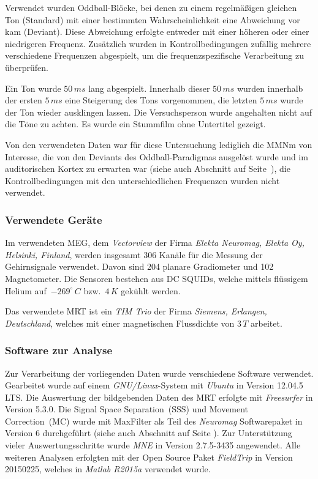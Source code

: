 \documentclass[doc,a4paper,12pt]{apa6}
\makeatletter
\DeclareRobustCommand*{\nameref}[1]{%
      \glqq{\myorg@nameref{#1}}\grqq%
    }%
\makeatother
\begin{document}
Verwendet wurden Oddball-Blöcke, bei denen zu einem regelmäßigen gleichen Ton (Standard) mit einer bestimmten Wahrscheinlichkeit eine Abweichung vor kam (Deviant). Diese Abweichung erfolgte entweder mit einer höheren oder einer niedrigeren Frequenz. Zusätzlich wurden in Kontrollbedingungen zufällig mehrere verschiedene Frequenzen abgespielt, um die frequenzspezifische Verarbeitung zu überprüfen.

Ein Ton wurde $50\,ms$ lang abgespielt. Innerhalb dieser $50\,ms$ wurden innerhalb der ersten $5\,ms$ eine Steigerung des Tons vorgenommen, die letzten $5\,ms$ wurde der Ton wieder ausklingen lassen. Die Versuchsperson wurde angehalten nicht auf die Töne zu achten. Es wurde ein Stummfilm ohne Untertitel gezeigt.

Von den verwendeten Daten war für diese Untersuchung lediglich die MMNm von Interesse, die von den Deviants des Oddball-Paradigmas ausgelöst wurde und im auditorischen Kortex zu erwarten war (siehe auch Abschnitt \nameref{sec:audicort} auf Seite~\pageref{sec:audicort}), die Kontrollbedingungen mit den unterschiedlichen Frequenzen wurden nicht verwendet.

\subsubsection{Verwendete Geräte}

Im verwendeten MEG, dem \emph{Vectorview} der Firma \emph{Elekta Neuromag, Elekta Oy, Helsinki, Finland}, werden insgesamt 306 Kanäle für die Messung der Gehirnsignale verwendet. Davon sind 204 planare Gradiometer und 102 Magnetometer. Die Sensoren bestehen aus DC SQUIDs, welche mittels flüssigem Helium auf~$-269^\circ\,C$ bzw.~$4\,K$ gekühlt werden.

Das verwendete MRT ist ein \emph{TIM Trio} der Firma \emph{Siemens, Erlangen, Deutschland}, welches mit einer magnetischen Flussdichte von $3\,T$ arbeitet.

\subsubsection{Software zur Analyse}
\label{sec:software}

Zur Verarbeitung der vorliegenden Daten wurde verschiedene Software verwendet. Gearbeitet wurde auf einem \emph{GNU/Linux}-System mit \emph{Ubuntu} in Version 12.04.5 LTS. Die Auswertung der bildgebenden Daten des MRT erfolgte mit \emph{Freesurfer} in Version 5.3.0. Die Signal Space Separation~(SSS) und Movement Correction~(MC) wurde mit MaxFilter als Teil des \emph{Neuromag} Softwarepaket in Version 6 durchgeführt (siehe auch Abschnitt \nameref{sec:maxfilter} auf Seite \pageref{sec:maxfilter}). Zur Unterstützung vieler Auswertungsschritte wurde \emph{MNE} in Version 2.7.5-3435 angewendet. Alle weiteren Analysen erfolgten mit der Open Source Paket \emph{FieldTrip} in Version 20150225, welches in \emph{Matlab R2015a} verwendet wurde.
\end{document}
